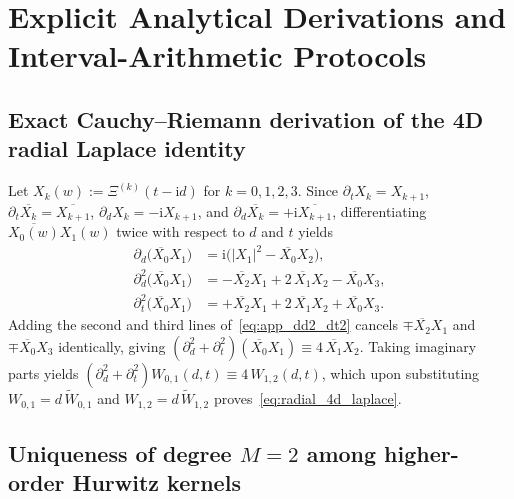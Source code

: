 \documentclass[11pt,reqno]{amsart}
\theoremstyle{definition}
\theoremstyle{remark}
\numberwithin{equation}{section}
\newcommand{\ii}{\mathrm{i}}
\begin{document}
\appendix

\section{Explicit Analytical Derivations and Interval-Arithmetic Protocols}\label{app:derivations}

\subsection{Exact Cauchy--Riemann derivation of the 4D radial Laplace identity}\label{app:laplace_cr}

Let $X_k(w) := \Xi^{(k)}(t - \ii d)$ for $k = 0, 1, 2, 3$. Since $\partial_t X_k = X_{k+1}$, $\partial_t\overline{X_k} = \overline{X_{k+1}}$, $\partial_d X_k = -\ii X_{k+1}$, and $\partial_d\overline{X_k} = +\ii\overline{X_{k+1}}$, differentiating $\overline{X_0(w)}X_1(w)$ twice with respect to $d$ and $t$ yields
\begin{equation}\label{eq:app_dd2_dt2}
\begin{aligned}
\partial_d\bigl(\overline{X_0}X_1\bigr) &= \ii\bigl(|X_1|^2 - \overline{X_0}X_2\bigr), \\
\partial_d^2\bigl(\overline{X_0}X_1\bigr) &= -\overline{X_2}X_1 + 2\,\overline{X_1}X_2 - \overline{X_0}X_3, \\
\partial_t^2\bigl(\overline{X_0}X_1\bigr) &= +\overline{X_2}X_1 + 2\,\overline{X_1}X_2 + \overline{X_0}X_3.
\end{aligned}
\end{equation}
Adding the second and third lines of~\eqref{eq:app_dd2_dt2} cancels $\mp\overline{X_2}X_1$ and $\mp\overline{X_0}X_3$ identically, giving $(\partial_d^2 + \partial_t^2)(\overline{X_0}X_1) \equiv 4\,\overline{X_1}X_2$. Taking imaginary parts yields $(\partial_d^2 + \partial_t^2)W_{0,1}(d,t) \equiv 4\,W_{1,2}(d,t)$, which upon substituting $W_{0,1} = d\,\widetilde{W}_{0,1}$ and $W_{1,2} = d\,\widetilde{W}_{1,2}$ proves~\eqref{eq:radial_4d_laplace}.

\subsection{Uniqueness of degree $M=2$ among higher-order Hurwitz kernels}\label{app:uniqueness_M2}
\end{document}
